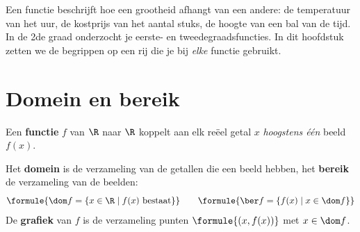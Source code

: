 %



Een functie beschrijft hoe een grootheid afhangt van een andere: de temperatuur van het uur, de kostprijs van het aantal stuks, de hoogte van een bal van de tijd. In de 2de graad onderzocht je eerste- en tweedegraadsfuncties. In dit hoofdstuk zetten we de begrippen op een rij die je bij \textit{elke} functie gebruikt.

\begin{oefeningen}[Start]

\end{oefeningen}

\section{Domein en bereik}

\begin{theorie}
Een \textbf{\textcolor{accent}{functie}} $f$ van $\R$ naar $\R$ koppelt aan elk reëel getal $x$ \textit{hoogstens één} beeld $f(x)$.

Het \textbf{\textcolor{accent}{domein}} is de verzameling van de getallen die een beeld hebben, het \textbf{\textcolor{accent}{bereik}} de verzameling van de beelden:
\[\formule{\dom f = \{x \in \R \mid f(x) \text{ bestaat}\}} \qquad \formule{\ber f = \{f(x) \mid x \in \dom f\}}\]
De \textbf{\textcolor{accent}{grafiek}} van $f$ is de verzameling punten $\formule{(x, f(x))}$ met $x \in \dom f$.
\end{theorie}

